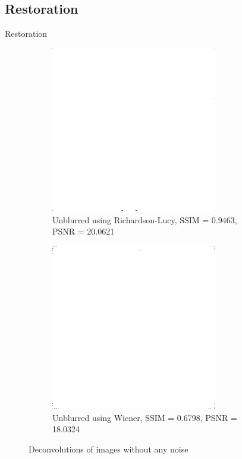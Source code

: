 \documentclass[aspectratio=1610]{beamer}
\begin{document}
\subsection{Restoration}
\begin{frame}{Restoration}
  
  \begin{figure}
    \centering
    \begin{subfigure}[t]{0.4\textwidth}
        \includegraphics[width=0.8\textwidth]{images/unblurred_rl.png}
        \caption{Unblurred using Richardson-Lucy, \break SSIM = 0.9463, PSNR = 20.0621}
        \label{fig:restored}
    \end{subfigure}
    \begin{subfigure}[t]{0.4\textwidth}
        \includegraphics[width=0.8\textwidth]{images/unblurred_w.png}
        \caption{Unblurred using Wiener, \break SSIM = 0.6798, PSNR = 18.0324}
        \label{fig:restored0}
    \end{subfigure}
    \caption{Deconvolutions of images without any noise}
  \end{figure}
\end{frame}
\end{document}

